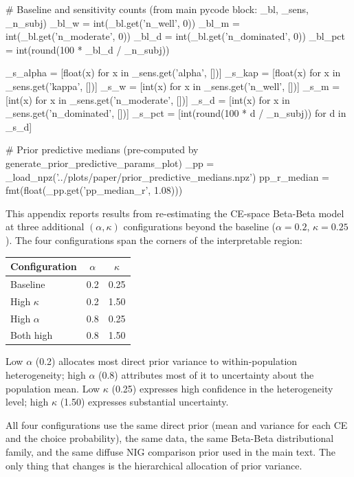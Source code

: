 \label{app:rk_sensitivity}

\begin{pycode}
# Baseline and sensitivity counts (from main pycode block: _bl, _sens, _n_subj)
_bl_w = int(_bl.get('n_well', 0))
_bl_m = int(_bl.get('n_moderate', 0))
_bl_d = int(_bl.get('n_dominated', 0))
_bl_pct = int(round(100 * _bl_d / _n_subj))

_s_alpha = [float(x) for x in _sens.get('alpha', [])]
_s_kap = [float(x) for x in _sens.get('kappa', [])]
_s_w = [int(x) for x in _sens.get('n_well', [])]
_s_m = [int(x) for x in _sens.get('n_moderate', [])]
_s_d = [int(x) for x in _sens.get('n_dominated', [])]
_s_pct = [int(round(100 * d / _n_subj)) for d in _s_d]

# Prior predictive medians (pre-computed by generate_prior_predictive_params_plot)
_pp = _load_npz('../plots/paper/prior_predictive_medians.npz')
pp_r_median = fmt(float(_pp.get('pp_median_r', 1.08)))
\end{pycode}

This appendix reports results from re-estimating the CE-space Beta-Beta model
at three additional $(\alpha, \kappa)$ configurations beyond the baseline
($\alpha = 0.2$, $\kappa = 0.25$). The four configurations span the corners of
the interpretable region:

\begin{center}
\begin{tabular}{lcc}
  \toprule
  Configuration & $\alpha$ & $\kappa$ \\
  \midrule
  Baseline        & 0.2 & 0.25 \\
  High $\kappa$   & 0.2 & 1.50 \\
  High $\alpha$     & 0.8 & 0.25 \\
  Both high       & 0.8 & 1.50 \\
  \bottomrule
\end{tabular}
\end{center}

\noindent Low $\alpha$ (0.2) allocates most direct prior variance to
within-population heterogeneity; high $\alpha$ (0.8) attributes most of it to
uncertainty about the population mean. Low $\kappa$ (0.25) expresses high
confidence in the heterogeneity level; high $\kappa$ (1.50) expresses
substantial uncertainty.

All four configurations use the same direct prior (mean and variance for each
CE and the choice probability), the same data, the same Beta-Beta
distributional family, and the same diffuse NIG comparison prior used in the
main text. The only thing that changes is the
hierarchical allocation of prior variance.

